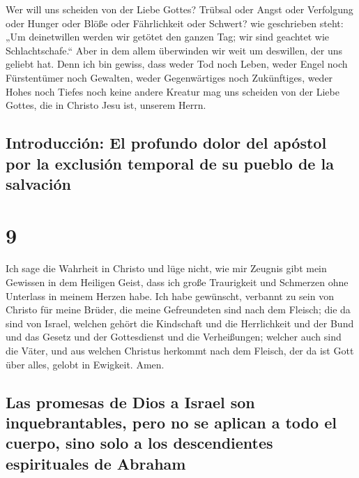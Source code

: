  Wer will uns scheiden von der Liebe Gottes? Trübsal oder
Angst oder Verfolgung oder Hunger oder Blöße oder Fährlichkeit oder
Schwert?  wie geschrieben steht: „Um deinetwillen werden
wir getötet den ganzen Tag; wir sind geachtet wie Schlachtschafe.``
 Aber in dem allem überwinden wir weit um deswillen, der
uns geliebt hat.  Denn ich bin gewiss, dass weder Tod
noch Leben, weder Engel noch Fürstentümer noch Gewalten, weder
Gegenwärtiges noch Zukünftiges,  weder Hohes noch Tiefes
noch keine andere Kreatur mag uns scheiden von der Liebe Gottes, die in
Christo Jesu ist, unserem Herrn.

\hypertarget{introducciuxf3n-el-profundo-dolor-del-apuxf3stol-por-la-exclusiuxf3n-temporal-de-su-pueblo-de-la-salvaciuxf3n}{%
\subsection{Introducción: El profundo dolor del apóstol por la exclusión
temporal de su pueblo de la
salvación}\label{introducciuxf3n-el-profundo-dolor-del-apuxf3stol-por-la-exclusiuxf3n-temporal-de-su-pueblo-de-la-salvaciuxf3n}}

\hypertarget{section-8}{%
\section{9}\label{section-8}}

 Ich sage die Wahrheit in Christo und lüge nicht, wie mir
Zeugnis gibt mein Gewissen in dem Heiligen Geist,  dass
ich große Traurigkeit und Schmerzen ohne Unterlass in meinem Herzen
habe.  Ich habe gewünscht, verbannt zu sein von Christo
für meine Brüder, die meine Gefreundeten sind nach dem Fleisch;
 die da sind von Israel, welchen gehört die Kindschaft und
die Herrlichkeit und der Bund und das Gesetz und der Gottesdienst und
die Verheißungen;  welcher auch sind die Väter, und aus
welchen Christus herkommt nach dem Fleisch, der da ist Gott über alles,
gelobt in Ewigkeit. Amen.

\hypertarget{las-promesas-de-dios-a-israel-son-inquebrantables-pero-no-se-aplican-a-todo-el-cuerpo-sino-solo-a-los-descendientes-espirituales-de-abraham}{%
\subsection{Las promesas de Dios a Israel son inquebrantables, pero no
se aplican a todo el cuerpo, sino solo a los descendientes espirituales
de
Abraham}\label{las-promesas-de-dios-a-israel-son-inquebrantables-pero-no-se-aplican-a-todo-el-cuerpo-sino-solo-a-los-descendientes-espirituales-de-abraham}}

